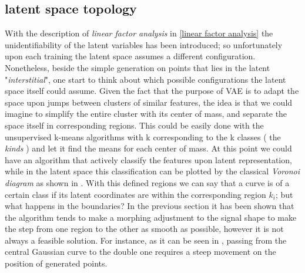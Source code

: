 \subsection{latent space topology}
With the description of \textit{linear factor analysis} in \cref{linear factor analysis} the unidentifiability of the latent variables has been introduced; so unfortunately upon each training the latent space assumes a different configuration. 
Nonetheless, beside the simple generation on points that lies in the latent "\textit{interstitial}", one start to think about which possible configurations the latent space itself could assume. Given the fact that the purpose of \acs{VAE} is to adapt the space upon jumps between clusters of similar features, the idea is that we could imagine to simplify the entire cluster with its center of mass, and separate the space itself in corresponding regions. This could be easily done with the unsupervised k-means algorithms with k corresponding to the k classes ( the \textit{kinds} ) and let it find the means for each center of mass. At this point we could have an algorithm that actively classify the features upon latent representation, while in the latent space this classification can be plotted by the classical \textit{Voronoi diagram} as shown in \Figure{\ref{fig:voronoi_ls}}. With this defined regions we can say that a curve is of a certain class if its latent coordinates are within the corresponding region $k_i$; but what happens in the boundaries? In the previous section it has been shown that the algorithm tends to make a morphing adjustment to the signal shape to make the step from one region to the other as smooth as possible, however it is not always a feasible solution. For instance, as it can be seen in \Figure{\ref{fig:step1_morph_gn4}}, passing from the central Gaussian curve to the double one requires a steep movement on the position of generated points.
